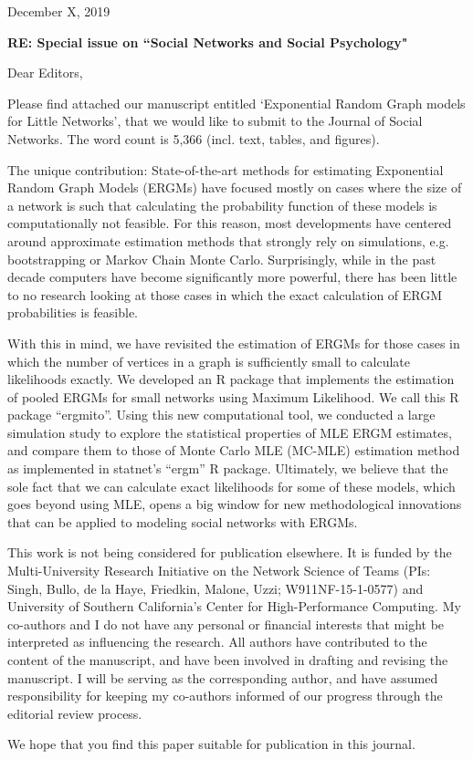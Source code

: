 \documentclass{article}
\begin{document}
\noindent December X, 2019

\noindent \textbf{RE: Special issue on “Social Networks and Social Psychology"}

\noindent Dear Editors,

Please find attached our manuscript entitled ‘Exponential Random Graph models for Little Networks’, that we would like to submit to the Journal of Social Networks. The word count is 5,366 (incl. text, tables, and figures).

The unique contribution: State-of-the-art methods for estimating Exponential Random Graph Models (ERGMs) have focused mostly on cases where the size of a network is such that calculating the probability function of these models is computationally not feasible. For this reason, most developments have centered around approximate estimation methods that strongly rely on simulations, e.g. bootstrapping or Markov Chain Monte Carlo. Surprisingly, while in the past decade computers have become significantly more powerful, there has been little to no research looking at those cases in which the exact calculation of ERGM probabilities is feasible.

With this in mind, we have revisited the estimation of ERGMs for those cases in which the number of vertices in a graph is sufficiently small to calculate likelihoods exactly. We developed an R package that implements the estimation of pooled ERGMs for small networks using Maximum Likelihood. We call this R package “ergmito”. Using this new computational tool, we conducted a large simulation study to explore the statistical properties of MLE ERGM estimates, and compare them to those of Monte Carlo MLE (MC-MLE) estimation method as implemented in statnet’s “ergm” R package. Ultimately, we believe that the sole fact that we can calculate exact likelihoods for some of these models, which goes beyond using MLE, opens a big window for new methodological innovations that can be applied to modeling social networks with ERGMs.

This work is not being considered for publication elsewhere. It is funded by the Multi-University Research Initiative on the Network Science of Teams (PIs: Singh, Bullo, de la Haye, Friedkin, Malone, Uzzi; W911NF-15-1-0577) and University of Southern California’s Center for High-Performance Computing. My co-authors and I do not have any personal or financial interests that might be interpreted as influencing the research. All authors have contributed to the content of the manuscript, and have been involved in drafting and revising the manuscript. I will be serving as the corresponding author, and have assumed responsibility for keeping my co-authors informed of our progress through the editorial review process.

We hope that you find this paper suitable for publication in this journal.
\end{document}
